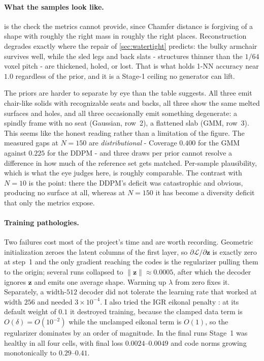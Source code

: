 \documentclass[11pt]{article}
\begin{document}
\paragraph{What the samples look like.}  is the check the
metrics cannot provide, since Chamfer distance is forgiving of a shape with
roughly the right mass in roughly the right places. Reconstruction degrades
exactly where the repair of \cref{sec:watertight} predicts: the bulky armchair
survives well, while the sled legs and back slats - structures thinner than the
$1/64$ voxel pitch - are thickened, holed, or lost. That is what holds 1-NN
accuracy near $1.0$ regardless of the prior, and it is a Stage-1 ceiling no
generator can lift.

The priors are harder to separate by eye than the table suggests. All three emit
chair-like solids with recognizable seats and backs, all three show the same
melted surfaces and holes, and all three occasionally emit something degenerate:
a spindly frame with no seat (Gaussian, row~2), a flattened slab (GMM, row~3).
This seems like the honest reading rather than a limitation of the figure. The
measured gaps at $N=150$ are \emph{distributional} - Coverage $0.400$ for the
GMM against $0.225$ for the DDPM - and three draws per prior cannot resolve a
difference in how much of the reference set gets matched. Per-sample
plausibility, which is what the eye judges here, is roughly comparable. The
contrast with $N=10$ is the point: there the DDPM's deficit was catastrophic and
obvious, producing no surface at all, whereas at $N=150$ it has become a
diversity deficit that only the metrics expose.

\paragraph{Training pathologies.} Two failures cost most of the project's time
and are worth recording. Geometric initialization zeroes the latent columns of
the first layer, so $\partial\mathcal{L}/\partial\mathbf{z}$ is exactly zero at
step~1 and the only gradient reaching the codes is the regularizer pulling them
to the origin; several runs collapsed to $\lVert\mathbf{z}\rVert \approx 0.0005$,
after which the decoder ignores $\mathbf{z}$ and emits one average shape. Warming
up $\lambda$ from zero fixes it. Separately, a width-$512$ decoder did not
tolerate the learning rate that worked at width $256$ and needed $3\times10^{-4}$.
I also tried the IGR eikonal penalty \citep{gropp2020igr}: at its default weight
of $0.1$ it destroyed training, because the clamped data term is $O(\delta) =
O(10^{-2})$ while the unclamped eikonal term is $O(1)$, so the regularizer
dominates by an order of magnitude. In the final runs Stage~1 was healthy in all
four cells, with final loss $0.0024$--$0.0049$ and code norms growing
monotonically to $0.29$--$0.41$.
\end{document}
